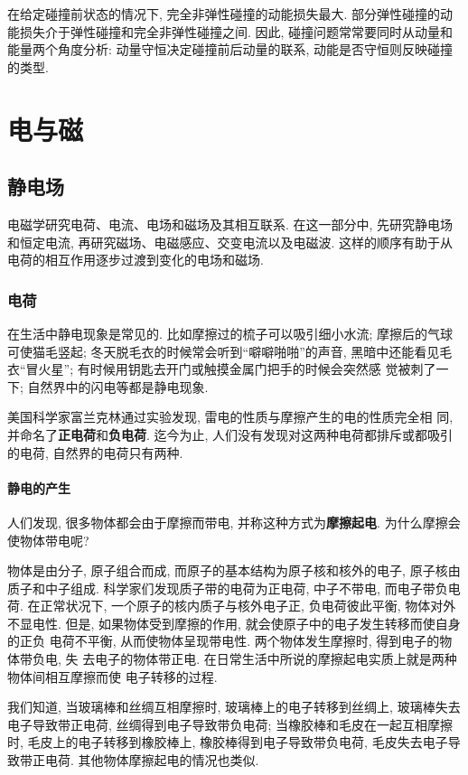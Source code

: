 \documentclass[11pt,a4paper]{ctexbook}
\begin{document}
在给定碰撞前状态的情况下, 完全非弹性碰撞的动能损失最大. 部分弹性碰撞的动能损失介于弹性碰撞和完全非弹性碰撞之间.
因此, 碰撞问题常常要同时从动量和能量两个角度分析: 动量守恒决定碰撞前后动量的联系, 动能是否守恒则反映碰撞的类型.

\part{电与磁}

\chapter{静电场}

电磁学研究电荷、电流、电场和磁场及其相互联系. 在这一部分中, 先研究静电场和恒定电流, 再研究磁场、电磁感应、交变电流以及电磁波. 这样的顺序有助于从电荷的相互作用逐步过渡到变化的电场和磁场.


\section{电荷}

在生活中静电现象是常见的. 比如摩擦过的梳子可以吸引细小水流;
摩擦后的气球可使猫毛竖起; 冬天脱毛衣的时候常会听到``噼噼啪啪''的声音,
黑暗中还能看见毛衣``冒火星''; 有时候用钥匙去开门或触摸金属门把手的时候会突然感
觉被刺了一下; 自然界中的闪电等都是静电现象.

美国科学家富兰克林通过实验发现, 雷电的性质与摩擦产生的电的性质完全相
同, 并命名了\textbf{正电荷}和\textbf{负电荷}.
迄今为止, 人们没有发现对这两种电荷都排斥或都吸引的电荷, 自然界的电荷只有两种.

\subsection{静电的产生}

人们发现, 很多物体都会由于摩擦而带电, 并称这种方式为\textbf{摩擦起电}.
为什么摩擦会使物体带电呢?

物体是由分子, 原子组合而成, 而原子的基本结构为原子核和核外的电子, 原子核由
质子和中子组成. 科学家们发现质子带的电荷为正电荷, 中子不带电, 而电子带负电荷.
在正常状况下, 一个原子的核内质子与核外电子正, 负电荷彼此平衡, 物体对外不显电性.
但是, 如果物体受到摩擦的作用, 就会使原子中的电子发生转移而使自身的正负
电荷不平衡, 从而使物体呈现带电性. 两个物体发生摩擦时, 得到电子的物体带负电, 失
去电子的物体带正电. 在日常生活中所说的摩擦起电实质上就是两种物体间相互摩擦而使
电子转移的过程.

我们知道, 当玻璃棒和丝绸互相摩擦时, 玻璃棒上的电子转移到丝绸上,
玻璃棒失去电子导致带正电荷, 丝绸得到电子导致带负电荷;
当橡胶棒和毛皮在一起互相摩擦时, 毛皮上的电子转移到橡胶棒上,
橡胶棒得到电子导致带负电荷, 毛皮失去电子导致带正电荷.
其他物体摩擦起电的情况也类似.
\end{document}
